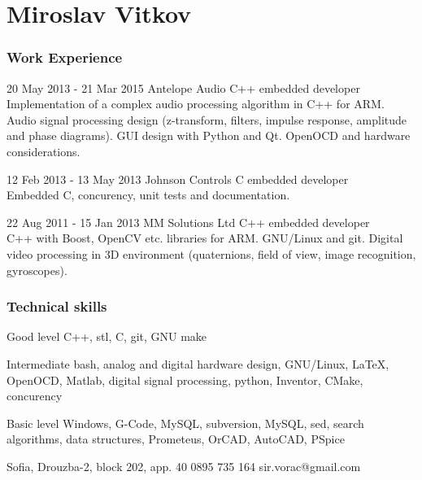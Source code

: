 \documentclass{tccv}
\begin{document}
\part{Miroslav Vitkov}


\section{Work Experience}
\begin{eventlist}
\item{20 May 2013 - 21 Mar 2015}
     {Antelope Audio}
     {C++ embedded developer} \\
Implementation of a complex audio processing algorithm in C++ for ARM.
Audio signal processing design (z-transform, filters, impulse response, amplitude and phase diagrams).
GUI design with Python and Qt.
OpenOCD and hardware considerations.

\item{12 Feb 2013 - 13 May 2013}
     {Johnson Controls}
     {C embedded developer} \\
Embedded C, concurency, unit tests and documentation.

\item{22 Aug 2011 - 15 Jan 2013}
     {MM Solutions Ltd}
     {C++ embedded developer} \\

C++ with Boost, OpenCV etc. libraries for ARM.
GNU/Linux and git.
Digital video processing in 3D environment (quaternions, field of view, image recognition, gyroscopes).
\end{eventlist}


\section{Technical skills}
\begin{factlist}
\item{Good level}
     {C++, stl, C, git, GNU make}

\item{Intermediate}
     {bash, analog and digital hardware design, GNU/Linux, LaTeX, OpenOCD, Matlab, digital signal processing, python, Inventor, CMake, concurency}

\item{Basic level}
     {Windows, G-Code, MySQL, subversion, MySQL, sed, search algorithms, data structures, Prometeus, OrCAD, AutoCAD, PSpice}
\end{factlist}


\personal
    {Sofia, Drouzba-2, block 202, app. 40}
    {0895 735 164}
    {sir.vorac@gmail.com}
\end{document}
